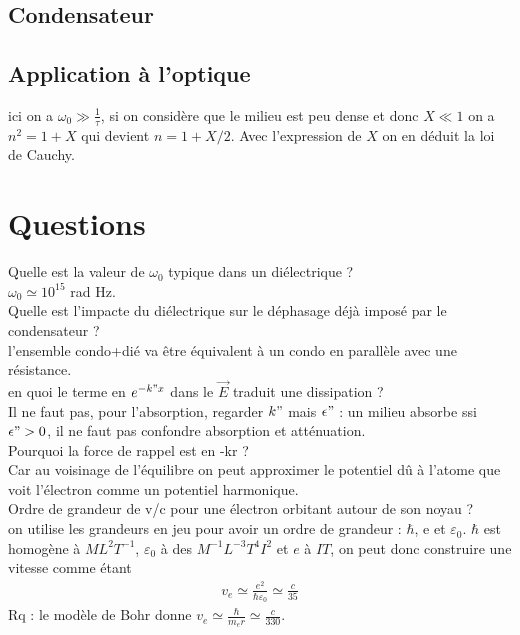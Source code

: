 \documentclass[12pt,prb,aps,epsf]{report}
\begin{document}
\subsection{Condensateur}

\subsection{Application à l'optique}

ici on a $\omega_0 \gg \frac{1}{\tau}$, si on considère que le milieu est peu dense et donc $X\ll1$ on a $n^2 = 1+X$ qui devient $n=1+X/2$. Avec l'expression de $X$ on en déduit la loi de Cauchy.

\section*{Questions}

Quelle est la valeur de $\omega_0$ typique dans un diélectrique ?\\
$\omega_0 \simeq 10^{15}$ rad Hz.\\

Quelle est l'impacte du diélectrique sur le déphasage déjà imposé par le condensateur ?\\
l'ensemble condo+dié va être équivalent à un condo en parallèle avec une résistance.\\

en quoi le terme en $e^{-k"x}$ dans le $\vec{E}$ traduit une dissipation ?\\
Il ne faut pas, pour l'absorption, regarder $k"$ mais $\epsilon"$ : un milieu absorbe ssi $\epsilon" > 0$, il ne faut pas confondre absorption et atténuation.\\

Pourquoi la force de rappel est en -kr ?\\
Car au voisinage de l'équilibre on peut approximer le potentiel dû à l'atome que voit l'électron comme un potentiel harmonique.\\

Ordre de grandeur de v/c pour une électron orbitant autour de son noyau ?\\
on utilise les grandeurs en jeu pour avoir un ordre de grandeur : $\hbar$, e et $\varepsilon_0$. $\hbar$ est homogène à $ML^2T^{-1}$, $\varepsilon_0$ à des $M^{-1}L^{-3}T^4I^2$ et $e$ à $IT$, on peut donc construire une vitesse comme étant 
\begin{eqnarray}
v_e \simeq \frac{e^2}{\hbar \varepsilon_0} \simeq \frac{c}{35}
\end{eqnarray}
Rq : le modèle de Bohr donne $v_e \simeq \frac{\hbar}{m_er}\simeq \frac{c}{330}$.\\
\end{document}
